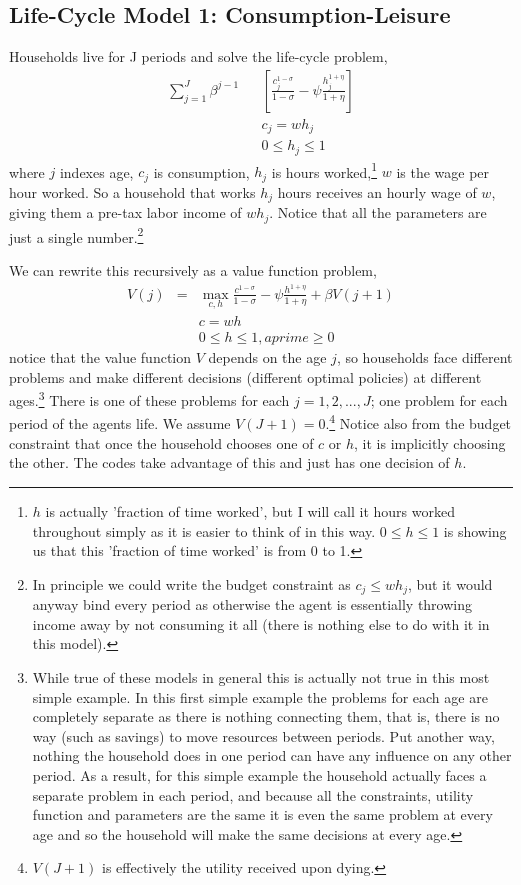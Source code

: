 
\subsection{Life-Cycle Model 1: Consumption-Leisure}
Households live for J periods and solve the life-cycle problem,
\begin{eqnarray*}
 \sum_{j=1}^J \beta^{j-1} && \left[ \frac{c_j^{1-\sigma}}{1-\sigma} - \psi \frac{h_j^{1+\eta}}{1+\eta} \right] \\
&& c_j= w h_j \\
&& 0\leq h_j \leq 1
\end{eqnarray*}
where $j$ indexes age, $c_j$ is consumption, $h_j$ is hours worked,\footnote{$h$ is actually 'fraction of time worked', but I will call it hours worked throughout simply as it is easier to think of in this way. $0\leq h \leq 1$ is showing us that this 'fraction of time worked' is from 0 to 1.} $w$ is the wage per hour worked. So a household that works $h_j$ hours receives an hourly wage of $w$, giving them a pre-tax labor income of $w h_j$. Notice that all the parameters are just a single number.\footnote{In principle we could write the budget constraint as $c_j\leq w h_j$, but it would anyway bind every period as otherwise the agent is essentially throwing income away by not consuming it all (there is nothing else to do with it in this model).}

We can rewrite this recursively as a value function problem,
\begin{eqnarray*}
 V(j)&=& \max_{c,h} \frac{c^{1-\sigma}}{1-\sigma} - \psi \frac{h^{1+\eta}}{1+\eta}  + \beta V(j+1) \\
&& c= w h \\
&& 0\leq h \leq 1, aprime\geq 0
\end{eqnarray*}
notice that the value function $V$ depends on the age $j$, so households face different problems and make different decisions (different optimal policies) at different ages.\footnote{While true of these models in general this is actually not true in this most simple example. In this first simple example the problems for each age are completely separate as there is nothing connecting them, that is, there is no way (such as savings) to move resources between periods. Put another way, nothing the household does in one period can have any influence on any other period. As a result, for this simple example the household actually faces a separate problem in each period, and because all the constraints, utility function and parameters are the same it is even the same problem at every age and so the household will make the same decisions at every age.} There is one of these problems for each $j=1,2,...,J$; one problem for each period of the agents life. We assume $V(J+1)=0$.\footnote{$V(J+1)$ is effectively the utility received upon dying.} Notice also from the budget constraint that once the household chooses one of $c$ or $h$, it is implicitly choosing the other. The codes take advantage of this and just has one decision of $h$.

